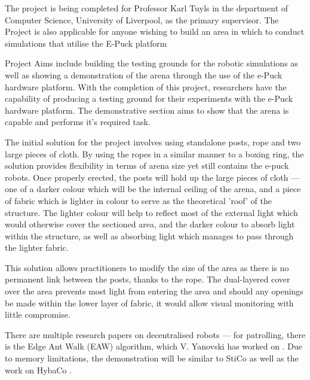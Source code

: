The project is being completed for Professor Karl Tuyls in the
department of Computer Science, University of Liverpool, as the primary
supervisor.  The Project is also applicable for anyone wishing to build an area
in which to conduct simulations that utilise the E-Puck platform\cite{ePuckSite}

Project Aims include building the testing grounds for the robotic simulations as
well as showing a demonstration of the arena through the use of the e-Puck
hardware platform.  With the completion of this project, researchers have the
capability of producing a testing ground for their experiments with the e-Puck
hardware platform.  The demonstrative section aims to show that the arena is
capable and performs it's required task.

The initial solution for the project involves using standalone posts, rope and
two large pieces of cloth.  By using the ropes in a similar manner to a boxing
ring, the solution provides flexibility in terms of arena size yet still 
contains the e-puck robots.  Once properly erected, the posts will hold up the
large pieces of cloth --- one of a darker colour which will be the internal
ceiling of the arena, and a piece of fabric which is lighter in colour to serve
as the theoretical 'roof' of the structure.  The lighter colour will help to
reflect most of the external light which would otherwise cover the sectioned
area, and the darker colour to absorb light within the structure, as well as
absorbing light which manages to pass through the lighter fabric.

This solution allows practitioners to modify the size of the area as there is no
permanent link between the posts, thanks to the rope.  The dual-layered cover
over the area prevents most light from entering the area and should any openings
be made within the lower layer of fabric, it would allow visual monitoring with
little compromise.

There are multiple research papers on decentralised robots --- for patrolling,
there is the Edge Ant Walk (EAW) algorithm, which V. Yanovski has worked on
\cite{Yanovski2003}.  Due to memory limitations, the demonstration will be 
similar to StiCo\cite{Ranjbar-Sahraei2012} as well as the work on HybaCo
\cite{Broecker2015}.